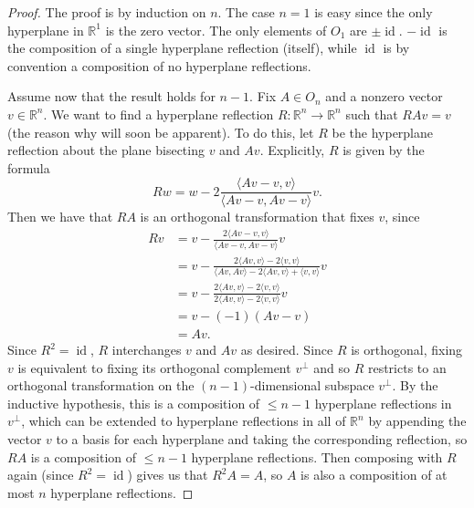 \documentclass{article}
\newcommand{\R}{\mathbb{R}}
\DeclareMathOperator{\id}{id}
\begin{document}
\begin{proof}
The proof is by induction on $n$. The case $n=1$ is easy since the only hyperplane in $\R^1$ is the zero vector. The only elements of $O_1$ are $\pm \id$. $-\id$ is the composition of a single hyperplane reflection (itself), while $\id$ is by convention a composition of no hyperplane reflections.

Assume now that the result holds for $n-1$. Fix $A \in O_n$ and a nonzero vector $v \in \R^n$. We want to find a hyperplane reflection $R : \R^n \to \R^n$ such that $RAv = v$ (the reason why will soon be apparent). To do this, let $R$ be the hyperplane reflection about the plane bisecting $v$ and $Av$. Explicitly, $R$ is given by the formula
$$Rw = w - 2\frac{\langle Av - v, v \rangle}{\langle Av -v, Av - v\rangle}v.$$
Then we have that $RA$ is an orthogonal transformation that fixes $v$, since 
\begin{align*}
Rv &= v - \frac{2 \langle Av - v, v \rangle}{\langle Av -v, Av -v \rangle} v \\
&= v - \frac{2\langle Av, v \rangle - 2\langle v, v \rangle}{\langle Av, Av \rangle - 2\langle Av, v \rangle + \langle v,v \rangle}v \\
&= v - \frac{2\langle Av,v \rangle - 2 \langle v,v \rangle}{2 \langle Av,v \rangle - 2 \langle v,v \rangle}v \\
&= v - (-1)(Av -v) \\
&= Av.
\end{align*}
Since $R^2 = \id$, $R$ interchanges $v$ and $Av$ as desired. Since $R$ is orthogonal, fixing $v$ is equivalent to fixing its orthogonal complement $v^\perp$ and so $R$ restricts to an orthogonal transformation on the $(n-1)$-dimensional subspace $v^\perp$. By the inductive hypothesis, this is a composition of $\leq n-1$ hyperplane reflections in $v^\perp$, which can be extended to hyperplane reflections in all of $\R^n$ by appending the vector $v$ to a basis for each hyperplane and taking the corresponding reflection, so $RA$ is a composition of $\leq n-1$ hyperplane reflections. Then composing with $R$ again (since $R^2 = \id$) gives us that $R^2A = A$, so $A$ is also a composition of at most $n$ hyperplane reflections.
\end{proof}

\end{document}
